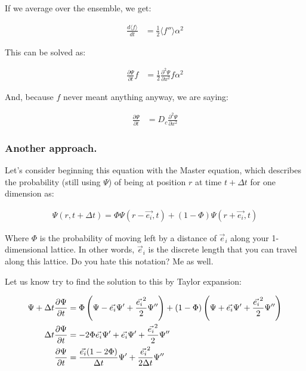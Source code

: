 If we average over the ensemble, we get: 

\begin{equation}
\begin{split}
    \frac{d\langle f \rangle}{dt} & = \frac{1}{2}\langle f'' \rangle \alpha^2 
\end{split}
\end{equation}

This can be solved as: 

\begin{equation}
\begin{split}
    \frac{\partial \Psi}{\partial t}f & = \frac{1}{2} \frac{\partial^2 \Psi}{\partial x^2}f \alpha^2
\end{split}
\end{equation}

And, because $f$ never meant anything anyway, we are saying: 

\begin{equation}
\begin{split} \label{sec:diffequation}
    \frac{\partial \Psi}{\partial t} & = D_c \frac{\partial^2 \Psi}{\partial x^2} 
\end{split}
\end{equation}


\subsubsection{Another approach.}

Let's consider beginning this equation with the Master equation, which describes the probability (still using $\Psi$) of being at position $r$ at time $t + \Delta t$ for one dimension as: 

\begin{equation}
\begin{split}
    \Psi(r,t + \Delta t) = \Phi\Psi(r - \Vec{e_i},t) + (1 - \Phi)\Psi(r + \Vec{e_i},t)
\end{split}
\end{equation}

Where $\Phi$ is the probability of moving left by a distance of $\Vec{e}_i$ along your 1-dimensional lattice. In other words, $\Vec{e}_i$ is the discrete length that you can travel along this lattice. Do you hate this notation? Me as well.\newline

Let us know try to find the solution to this by Taylor expansion: 

\begin{equation}
\begin{split}
    \Psi + \Delta t\frac{\partial \Psi}{\partial t} &= \Phi\left(\Psi - \Vec{e_i}\Psi' + \frac{\Vec{e_i}^2}{2}\Psi''\right) + (1 - \Phi)\left(\Psi + \Vec{e_i}\Psi' + \frac{\Vec{e_i}^2}{2}\Psi''\right) \\
    \Delta t\frac{\partial \Psi}{\partial t} &= -2\Phi\Vec{e_i}\Psi' + \Vec{e_i}\Psi' + \frac{\Vec{e_i}^2}{2}\Psi'' \\
    \frac{\partial \Psi}{\partial t} &= \frac{\Vec{e_i}(1-2\Phi)}{\Delta t}\Psi' + \frac{\Vec{e_i}^2}{2\Delta t}\Psi'' \\
\end{split}
\end{equation}

